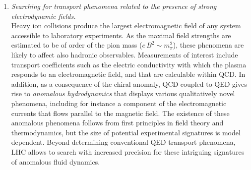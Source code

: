 \documentclass[../report.tex]{subfiles}
\begin{document}
\begin{enumerate}
\item {\it Searching for transport phenomena related to the presence of strong electrodynamic fields.}\\ Heavy ion collisions produce the largest electromagnetic field of any system accessible to laboratory experiments. As the maximal field strengths are estimated to be of order of the pion mass ($e\, B^2 \sim m_\pi^2$), these phenomena are likely to affect also hadronic observables. Measurements of interest include transport coefficients such as the electric conductivity with which the plasma responds to an electromagnetic field, and that are calculable within QCD. In addition, as a consequence of the chiral anomaly, QCD coupled to QED gives rise to {\it anomalous hydrodynamics} that displays various qualitatively novel phenomena, including for instance a component of the electromagnetic currents that flows parallel to the magnetic field. The existence of these anomalous phenomena follows from first principles in field theory and thermodynamics, but the size of potential experimental signatures is model dependent.  Beyond determining conventional QED transport phenomena, LHC allows to search with increased precision for these intriguing signatures of anomalous fluid dynamics. 
\end{enumerate}
\end{document}
